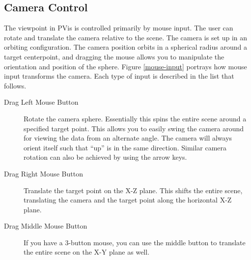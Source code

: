 \subsection{Camera Control}

The viewpoint in PVis is controlled primarily by mouse input.  The user can rotate and translate the camera relative to the scene.  The camera is set up in an orbiting configuration.  The camera position orbits in a spherical radius around a target centerpoint, and dragging the mouse allows you to manipulate the orientation and position of the sphere.  Figure \ref{mouse-input} portrays how mouse input transforms the camera.  Each type of input is described in the list that follows.
\begin{description}
\item[Drag Left Mouse Button]
	Rotate the camera sphere.  Essentially this spins the entire scene around a specified target point.  This allows you to easily swing the camera around for viewing the data from an alternate angle.  The camera will always orient itself such that ``up'' is in the same direction.  Similar camera rotation can also be achieved by using the arrow keys.

\item[Drag Right Mouse Button]
	Translate the target point on the X-Z plane.  This shifts the entire scene, translating the camera and the target point along the horizontal X-Z plane.

\item[Drag Middle Mouse Button]
	If you have a 3-button mouse, you can use the middle button to translate the entire scene on the X-Y plane as well.
	

\end{description}
